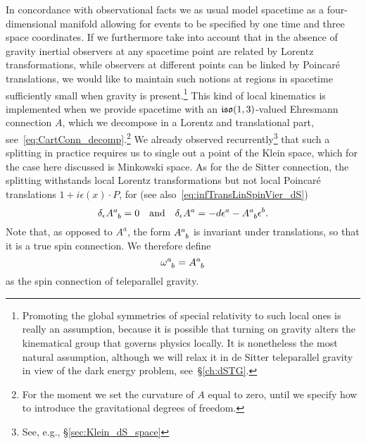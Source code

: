 \documentclass[
final,
11pt,
a4paper,
DIV=11,
headinclude=true,
footinclude=false,
bibliography=totoc,
twoside=true,  %
BCOR=5mm
]{scrbook}
\begin{document}
In concordance with observational facts we as usual model 
spacetime as a four-dimensional manifold allowing for events to 
be specified by one time and three space coordinates. If we 
furthermore take into account that in the absence of gravity 
inertial observers at any spacetime point are related by Lorentz 
transformations, while observers at different points can be 
linked by Poincar\'e translations, we would like to maintain such 
notions at regions in spacetime sufficiently small when gravity 
is present.\footnote{Promoting the global symmetries of special 
  relativity to such local ones is really an assumption, because 
  it is possible that turning on gravity alters the kinematical 
  group that governs physics locally. It is nonetheless the most 
  natural assumption, although we will relax it in de Sitter 
  teleparallel gravity in view of the dark energy problem, 
  see~\S\ref{ch:dSTG}.}
This kind of local kinematics is implemented when we provide 
spacetime with an $\mathfrak{iso}(1,3)$-valued Ehresmann connection 
$A$, which we decompose in a Lorentz and translational part, 
see~\eqref{eq:CartConn_decomp}.\footnote{For the moment we set 
  the curvature of $A$ equal to zero, until we specify how to 
  introduce the gravitational degrees of freedom.}
We already observed recurrently\footnote{See, e.g., 
  \S\ref{sec:Klein_dS_space}}
that such a splitting in practice requires us to single out 
a point of the Klein space, which for the case here discussed is 
Minkowski space. As for the de Sitter connection, the splitting 
withstands local Lorentz transformations but not local Poincar\'e 
translations $1 + i \epsilon(x)\cdot P$, for (see 
also~\eqref{eq:infTransLinSpinVier_dS})
\begin{equation}
\label{eq:infTransLinSpinVier_M}
  \delta_\epsilon A\ind{^a_b} = 0
  \quad\text{and}\quad
  \delta_\epsilon A^a = - d\epsilon^a - A\ind{^a_b} \epsilon^b.
\end{equation}
Note that, as opposed to $A^a$, the form $A\ind{^a_b}$ is 
invariant under translations, so that it is a true spin 
connection. We therefore define
\begin{equation}
\label{eq:nonlin_spin_RC}
  \omega\ind{^a_b} = A\ind{^a_b}
\end{equation}
as the spin connection of teleparallel gravity.
\end{document}
